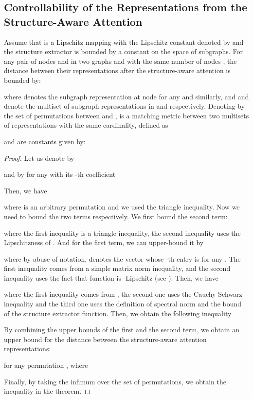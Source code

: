 \subsection{Controllability of the Representations from the Structure-Aware Attention}
\begin{theorem}
Assume that  is a Lipschitz mapping with the Lipschitz constant denoted by  and the structure extractor  is bounded by a constant  on the space of subgraphs. For any pair of nodes  and  in two graphs  and  with the same number of nodes , the distance between their representations after the structure-aware attention is bounded by:
    
    where  denotes the subgraph representation at node  for any  and  similarly, and  and  denote the multiset of subgraph representations in  and  respectively. Denoting by  the set of permutations between  and ,  is a matching metric between two multisets of representations with the same cardinality, defined as
    
     and  are constants given by:
    
\end{theorem}
\begin{proof}


    Let us denote by 
    
    and by  for any  with its -th coefficient
    
    Then, we have
    
    where  is an arbitrary permutation and we used the triangle inequality. Now we need to bound the two terms respectively. We first bound the second term:
    
    where the first inequality is a triangle inequality, the second inequality uses the Lipschitzness of . And for the first term, we can upper-bound it by
    
    where by abuse of notation,  denotes the vector whose -th entry is  for any . The first inequality comes from a simple matrix norm inequality, and the second inequality uses the fact that  function is -Lipschitz (see \eg \citet{gao2017properties}). Then, we have
    
    where the first inequality comes from , the second one uses the Cauchy-Schwarz inequality and the third one uses the definition of spectral norm and the bound of the structure extractor function. Then, we obtain the following inequality
    
    By combining the upper bounds of the first and the second term, we obtain an upper bound for the distance between the structure-aware attention representations:
    
    for any permutation , where 
    
    Finally, by taking the infimum over the set of permutations, we obtain
    the inequality in the theorem.
\end{proof}

